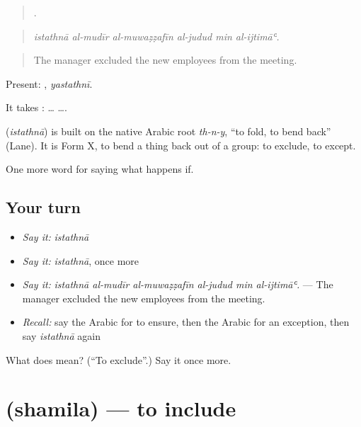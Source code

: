 \begin{quote}
     .
\end{quote}

\begin{quote}
\emph{istathnā al-mudīr al-muwaẓẓafīn al-judud min al-ijtimāʿ.}
\end{quote}

\begin{quote}
The manager excluded the new employees from the meeting.
\end{quote}

Present: , \emph{yastathnī}.

It takes :  …  ….

\begin{cousinweb}
\textbf{} (\emph{istathnā}) is built on the native Arabic root \emph{th-n-y}, \textquotedblleft{}to fold, to bend back\textquotedblright{} (Lane). It is Form X, to bend a thing back out of a group: to exclude, to except.
\end{cousinweb}

\begin{grammarlens}[title={What you've built}]
One more word for saying what happens if.
\end{grammarlens}

\subsection*{Your turn}
\begin{itemize}
\raggedright
  \item \emph{Say it:} \emph{istathnā}
  \item \emph{Say it:} \emph{istathnā}, once more
  \item \emph{Say it:} \emph{istathnā al-mudīr al-muwaẓẓafīn al-judud min al-ijtimāʿ.} — The manager excluded the new employees from the meeting.
  \item \emph{Recall:} say the Arabic for to ensure, then the Arabic for an exception, then say \emph{istathnā} again
\end{itemize}

\begin{tcolorbox}[breakable,colback=teal!4,colframe=teal!35!black,title={Before you move on}]
What does  mean? (\textquotedblleft{}To exclude\textquotedblright{}.) Say it once more.
\end{tcolorbox}
\section[\texorpdfstring{\ar{شمل} (shamila)}{شمل (shamila)}]{ (shamila) — to include}

